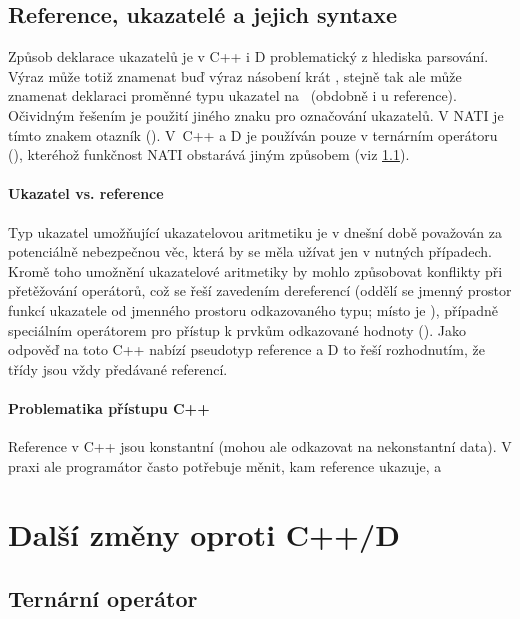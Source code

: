 \subsection{Reference, ukazatelé a jejich syntaxe} \label{pointers}
Způsob deklarace ukazatelů je v C++ i D problematický z hlediska parsování. Výraz  může totiž znamenat buď výraz násobení  krát , stejně tak ale může znamenat deklaraci proměnné  typu ukazatel na ~(obdobně i u reference). Očividným řešením je použití jiného znaku pro označování ukazatelů. V NATI je tímto znakem otazník (). V~C++ a D je používán pouze v ternárním operátoru (), kteréhož funkčnost NATI obstarává jiným způsobem (viz \ref{ternary}).

\paragraph{Ukazatel vs. reference}
Typ ukazatel umožňující ukazatelovou aritmetiku je v dnešní době považován za potenciálně nebezpečnou věc, která by se měla užívat jen v nutných případech. Kromě toho umožnění ukazatelové aritmetiky by mohlo způsobovat konflikty při přetěžování operátorů, což se řeší zavedením dereferencí (oddělí se jmenný prostor funkcí ukazatele od jmenného prostoru odkazovaného typu; místo  je ), případně speciálním operátorem pro přístup k prvkům odkazované hodnoty (). Jako odpověď na toto C++ nabízí pseudotyp reference a D to řeší rozhodnutím, že třídy jsou vždy předávané referencí.

\paragraph{Problematika přístupu C++} Reference v C++ jsou konstantní (mohou ale odkazovat na nekonstantní data). V praxi ale programátor často potřebuje měnit, kam reference ukazuje, a 

\section{Další změny oproti C++/D}

\subsection{Ternární operátor} \label{ternary}

          
